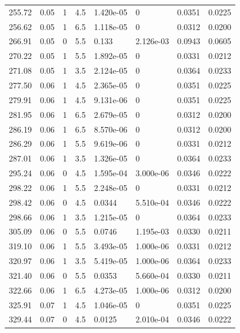 \documentclass[preview]{standalone}
\begin{document}
{{{\begin{tabular}{L{1.2cm}C{1.2cm} C{0.3cm}C{0.5cm} C{1.4cm}C{1.4cm} C{1.4cm}C{1.4cm}}
  255.72  &  0.05  & 1     & 4.5 &  1.420e-05  & 0  & 0.0351 &  0.0225   \\ 
  256.62  &  0.05  & 1     & 6.5 &  1.118e-05  & 0  & 0.0312 &  0.0200   \\ 
  266.91  &  0.05  & 0     & 5.5 &  0.133  & 2.126e-03  & 0.0943 &  0.0605   \\ 
  270.22  &  0.05  & 1     & 5.5 &  1.892e-05  & 0  & 0.0331 &  0.0212   \\ 
  271.08  &  0.05  & 1     & 3.5 &  2.124e-05  & 0  & 0.0364 &  0.0233   \\ 
  277.50  &  0.06  & 1     & 4.5 &  2.365e-05  & 0  & 0.0351 &  0.0225   \\ 
  279.91  &  0.06  & 1     & 4.5 &  9.131e-06  & 0  & 0.0351 &  0.0225   \\ 
  281.95  &  0.06  & 1     & 6.5 &  2.679e-05  & 0  & 0.0312 &  0.0200   \\ 
  286.19  &  0.06  & 1     & 6.5 &  8.570e-06  & 0  & 0.0312 &  0.0200   \\ 
  286.29  &  0.06  & 1     & 5.5 &  9.619e-06  & 0  & 0.0331 &  0.0212   \\ 
  287.01  &  0.06  & 1     & 3.5 &  1.326e-05  & 0  & 0.0364 &  0.0233   \\ 
  295.24  &  0.06  & 0     & 4.5 &  1.595e-04  & 3.000e-06  & 0.0346 &  0.0222   \\ 
  298.22  &  0.06  & 1     & 5.5 &  2.248e-05  & 0  & 0.0331 &  0.0212   \\ 
  298.42  &  0.06  & 0     & 4.5 &  0.0344  & 5.510e-04  & 0.0346 &  0.0222   \\ 
  298.66  &  0.06  & 1     & 3.5 &  1.215e-05  & 0  & 0.0364 &  0.0233   \\ 
  305.09  &  0.06  & 0     & 5.5 &  0.0746  & 1.195e-03  & 0.0330 &  0.0211   \\ 
  319.10  &  0.06  & 1     & 5.5 &  3.493e-05  & 1.000e-06  & 0.0331 &  0.0212   \\ 
  320.97  &  0.06  & 1     & 3.5 &  5.419e-05  & 1.000e-06  & 0.0364 &  0.0233   \\ 
  321.40  &  0.06  & 0     & 5.5 &  0.0353  & 5.660e-04  & 0.0330 &  0.0211   \\ 
  322.66  &  0.06  & 1     & 6.5 &  4.273e-05  & 1.000e-06  & 0.0312 &  0.0200   \\ 
  325.91  &  0.07  & 1     & 4.5 &  1.046e-05  & 0  & 0.0351 &  0.0225   \\ 
  329.44  &  0.07  & 0     & 4.5 &  0.0125  & 2.010e-04  & 0.0346 &  0.0222   \\ 

\end{tabular}}}}
\end{document}

